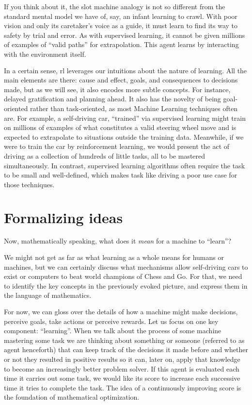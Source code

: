 If you think about it, the slot machine analogy is not so different from the
standard mental model we have of, say, an infant learning to crawl. With poor
vision and only its caretaker's voice as a guide, it must learn to find its way
to safety by trial and error. As with supervised learning, it cannot be given
millions of examples of ``valid paths'' for extrapolation. This agent learns by
interacting with the environment itself.

In a certain sense, \ac{rl} leverages our intuitions about the nature of
learning.  All the main elements are there: cause and effect, goals, and
consequences to decisions made, but as we will see, it also encodes more subtle
concepts. For instance, delayed gratification and planning ahead. It also has
the novelty of being goal-oriented rather than task-oriented, as most Machine
Learning techniques often are. For example, a self-driving car, ``trained'' via
supervised learning might train on millions of examples of what constitutes a
valid steering wheel move and is expected to extrapolate to situations outside
the training data. Meanwhile, if we were to train the car by reinforcement
learning, we would present the act of driving as a collection of hundreds of
little tasks, all to be mastered simultaneously. In contrast, supervised
learning algorithms often require the task to be small and well-defined, which
makes task like driving a poor use case for those techniques.

\section{Formalizing ideas}

Now, mathematically speaking, what does it \textit{mean} for a 
machine to ``learn''?

We might not get as far as what learning as a whole means for humans or
machines, but we can certainly discuss what mechanisms allow self-driving cars
to exist or computers to beat world champions of Chess and Go. For that, we need
to identify the key concepts in the previously evoked picture, and express them
in the language of mathematics.

For now, we can gloss over the details of how a machine might make decisions,
perceive goals, take actions or perceive rewards. Let us focus on one key
component: ``learning''. When we talk about the process of some machine
mastering some task we are thinking about something or someone (referred to as
agent henceforth) that can keep track of the decisions it made before and
whether or not they resulted in positive results so it can, later on, apply that
knowledge to become an increasingly better problem solver. If this agent is
evaluated each time it carries out some task, we would like its score to
increase each successive time it tries to complete the task.  The idea of a
continuously improving score is the foundation of mathematical optimization.


